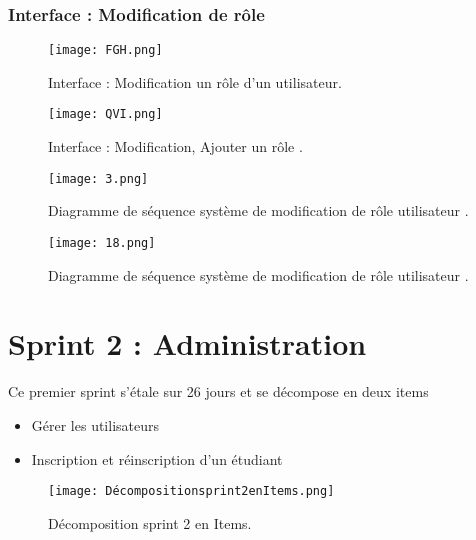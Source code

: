 \subsubsection{ Interface : Modification de rôle  }
\begin{figure}[ht]
	\centering
	\texttt{[image: FGH.png]}
	\caption{Interface : Modification un rôle d'un utilisateur.}
	\label{fig:Modification de rôle1}
\end{figure}
\FloatBarrier
\begin{figure}[ht]
	\centering
	\texttt{[image: QVI.png]}
	\caption{Interface : Modification, Ajouter un rôle .}
	\label{fig:2 }
\end{figure}
\FloatBarrier
\begin{figure}[ht]
	\centering
	\texttt{[image: 3.png]}
	\caption{Diagramme de séquence système de modification de rôle utilisateur .}
	\label{fig:Diagramme de séquence système de modification de rôle utilisateur }
\end{figure}
\FloatBarrier
\begin{figure}[ht]
	\centering
	\texttt{[image: 18.png]}
	\caption{Diagramme de séquence système de modification de rôle utilisateur .}
	\label{fig:Diagramme de séquence système de modification de rôle utilisateur }
\end{figure}
\FloatBarrier
\clearpage



\section{Sprint 2 : Administration }



\begin{fquote}
Ce premier sprint s’étale sur 26 jours et se décompose en deux items \end{fquote}
\smallskip
\begin{itemize}[label=$\diamond$]
	\item Gérer les utilisateurs
    \item  Inscription et réinscription d'un étudiant
	
\end{itemize}
\medskip
\medskip
\medskip
\medskip
\medskip
\medskip
\medskip
\medskip
\medskip
\medskip
\medskip
\begin{figure}[ht]
	\centering
	\texttt{[image: Décompositionsprint2enItems.png]}
	\caption{Décomposition sprint 2 en Items.}
	\label{fig:Décomposition sprint 2 en Items}
\end{figure}
\FloatBarrier
\clearpage




